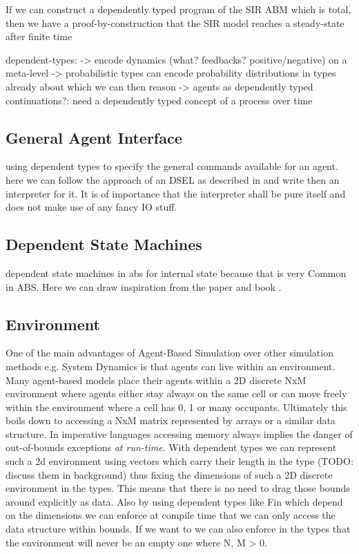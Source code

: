 If we can construct a dependently typed program of the SIR ABM which is total, then we have a proof-by-construction that the SIR model reaches a steady-state after finite time

dependent-types:
-> encode dynamics (what? feedbacks? positive/negative) on a meta-level
-> probabilistic types can encode probability distributions in types already about which we can then reason
-> agents as dependently typed continuations?: need a dependently typed concept of a process over time

\subsection{General Agent Interface}
using dependent types to specify the general commands available for an agent. here we can follow the approach of an DSEL as described in \cite{brady_correct-by-construction_2010} and write then an interpreter for it. It is of importance that the interpreter shall be pure itself and does not make use of any fancy IO stuff.

\subsection{Dependent State Machines}
dependent state machines in abs for internal state because that is very Common in ABS. Here we can draw inspiration from the paper \cite{brady_state_2016} and book \cite{brady_type-driven_2017}.

\subsection{Environment}
One of the main advantages of Agent-Based Simulation over other simulation methods e.g. System Dynamics is that agents can live within an environment. Many agent-based models place their agents within a 2D discrete NxM environment where agents either stay always on the same cell or can move freely within the environment where a cell has 0, 1 or many occupants. Ultimately this boils down to accessing a NxM matrix represented by arrays or a similar data structure. In imperative languages accessing memory always implies the danger of out-of-bounds exceptions \textit{at run-time}. With dependent types we can represent such a 2d environment using vectors which carry their length in the type (TODO: discuss them in background) thus fixing the dimensions of such a 2D discrete environment in the types. This means that there is no need to drag those bounds around explicitly as data. Also by using dependent types like Fin which depend on the dimensions we can enforce at compile time that we can only access the data structure within bounds. If we want to we can also enforce in the types that the environment will never be an empty one where N, M > 0.

